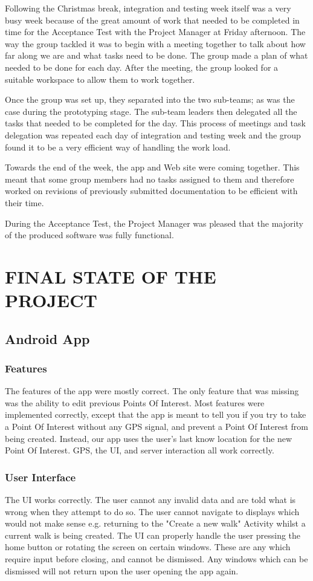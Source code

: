 \documentclass{project}
\begin{document}
Following the Christmas break, integration and testing week itself was a very busy week because of the great amount of work that needed to be completed in time for the Acceptance Test with the Project Manager at Friday afternoon. The way the group tackled it was to begin with a meeting together to talk about how far along we are and what tasks need to be done. The group made a plan of what needed to be done for each day. After the meeting, the group looked for a suitable workspace to allow them to work together.

Once the group was set up, they separated into the two sub-teams; as was the case during the prototyping stage. The sub-team leaders then delegated all the tasks that needed to be completed for the day. This process of meetings and task delegation was repeated each day of integration and testing week and the group found it to be a very efficient way of handling the work load.

Towards the end of the week, the app and Web site were coming together. This meant that some group members had no tasks assigned to them and therefore worked on revisions of previously submitted documentation to be efficient with their time.

During the Acceptance Test, the Project Manager was pleased that the majority of the produced software was fully functional. 


\newpage


\section{FINAL STATE OF THE PROJECT}
\subsection{Android App}

\subsubsection{Features}
The features of the app were mostly correct. The only feature that was missing was the ability to edit previous
Points Of Interest.
Most features were implemented correctly, except that the app is meant to tell you if you try to take a Point Of Interest
without any GPS signal, and prevent a Point Of Interest from being created. Instead, our app uses the user's last know location
for the new Point Of Interest.
GPS, the UI, and server interaction all work correctly.

\subsubsection{User Interface}
The UI works correctly. The user cannot any invalid data and are told what is wrong when they attempt to do so.
The user cannot navigate to displays which would not make sense e.g. returning to the "Create a new walk" Activity
whilst a current walk is being created.
The UI can properly handle the user pressing the home button or rotating the screen on certain windows. These are
any which require input before closing, and cannot be dismissed. Any windows which can be dismissed will not return
upon the user opening the app again.
\end{document}
